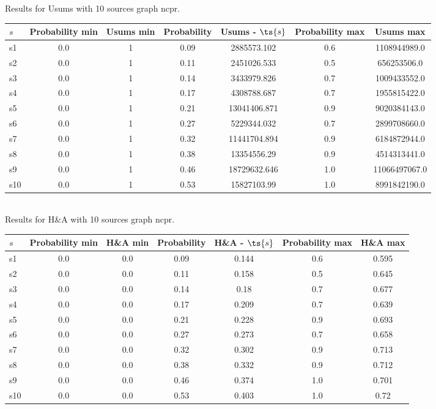 \documentclass{article}
\begin{document}
\noindent Results for Usums with 10 sources graph ncpr.

\noindent\begin{tabular}{|l|c|c|c|c|c|c|}
\hline
$s$& Probability min & Usums min & Probability & Usums - $\ts{s}$ & Probability max & Usums max\\
\hline
s1 &0.0 & 1 & 0.09 & 2885573.102 & 0.6 & 1108944989.0\\
\hline
s2 &0.0 & 1 & 0.11 & 2451026.533 & 0.5 & 656253506.0\\
\hline
s3 &0.0 & 1 & 0.14 & 3433979.826 & 0.7 & 1009433552.0\\
\hline
s4 &0.0 & 1 & 0.17 & 4308788.687 & 0.7 & 1955815422.0\\
\hline
s5 &0.0 & 1 & 0.21 & 13041406.871 & 0.9 & 9020384143.0\\
\hline
s6 &0.0 & 1 & 0.27 & 5229344.032 & 0.7 & 2899708660.0\\
\hline
s7 &0.0 & 1 & 0.32 & 11441704.894 & 0.9 & 6184872944.0\\
\hline
s8 &0.0 & 1 & 0.38 & 13354556.29 & 0.9 & 4514313441.0\\
\hline
s9 &0.0 & 1 & 0.46 & 18729632.646 & 1.0 & 11066497067.0\\
\hline
s10 &0.0 & 1 & 0.53 & 15827103.99 & 1.0 & 8991842190.0\\
\hline
\end{tabular}\\

\noindent Results for H\&A with 10 sources graph ncpr.

\noindent\begin{tabular}{|l|c|c|c|c|c|c|}
\hline
$s$& Probability min & H\&A min & Probability & H\&A - $\ts{s}$ & Probability max & H\&A max\\
\hline
s1 &0.0 & 0.0 & 0.09 & 0.144 & 0.6 & 0.595\\
\hline
s2 &0.0 & 0.0 & 0.11 & 0.158 & 0.5 & 0.645\\
\hline
s3 &0.0 & 0.0 & 0.14 & 0.18 & 0.7 & 0.677\\
\hline
s4 &0.0 & 0.0 & 0.17 & 0.209 & 0.7 & 0.639\\
\hline
s5 &0.0 & 0.0 & 0.21 & 0.228 & 0.9 & 0.693\\
\hline
s6 &0.0 & 0.0 & 0.27 & 0.273 & 0.7 & 0.658\\
\hline
s7 &0.0 & 0.0 & 0.32 & 0.302 & 0.9 & 0.713\\
\hline
s8 &0.0 & 0.0 & 0.38 & 0.332 & 0.9 & 0.712\\
\hline
s9 &0.0 & 0.0 & 0.46 & 0.374 & 1.0 & 0.701\\
\hline
s10 &0.0 & 0.0 & 0.53 & 0.403 & 1.0 & 0.72\\
\hline
\end{tabular}\\
\end{document}
